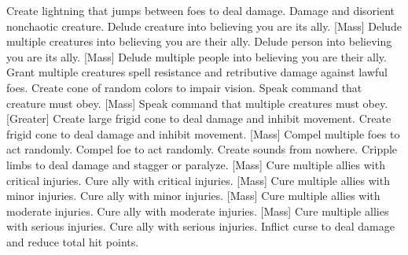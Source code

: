     {Create lightning that jumps between foes to deal damage.}
    {Damage and disorient nonchaotic creature.}
    {Delude creature into believing you are its ally.}
[Mass]
    {Delude multiple creatures into believing you are their ally.}
    {Delude person into believing you are its ally.}
[Mass]
    {Delude multiple people into believing you are their ally.}
    {Grant multiple creatures spell resistance and retributive damage against lawful foes.}
    {Create cone of random colors to impair vision.}
    {Speak command that creature must obey.}
[Mass]
    {Speak command that multiple creatures must obey.}
[Greater]
    {Create large frigid cone to deal damage and inhibit movement.}
    {Create frigid cone to deal damage and inhibit movement.}
[Mass]
    {Compel multiple foes to act randomly.}
    {Compel foe to act randomly.}
    {Create sounds from nowhere.}
    {Cripple limbs to deal damage and stagger or paralyze.}
[Mass]
    {Cure multiple allies with critical injuries.}
    {Cure ally with critical injuries.}
[Mass]
    {Cure multiple allies with minor injuries.}
    {Cure ally with minor injuries.}
[Mass]
    {Cure multiple allies with moderate injuries.}
    {Cure ally with moderate injuries.}
[Mass]
    {Cure multiple allies with serious injuries.}
    {Cure ally with serious injuries.}
    {Inflict curse to deal damage and reduce total hit points.}
